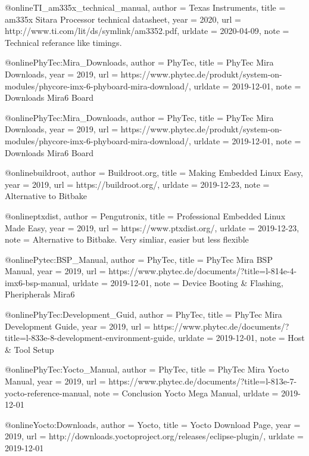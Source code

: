 @online{TI_am335x_technical_manual,
author = {Texas Instruments},
title = {am335x Sitara Processor technical datasheet},
year = 2020,
url = {http://www.ti.com/lit/ds/symlink/am3352.pdf},
urldate = {2020-04-09},
note = {Technical referance like timings.}
}




@online{PhyTec:Mira_Downloads,
author = {PhyTec},
title = {{PhyTec Mira} Downloads},
year = 2019,
url = {https://www.phytec.de/produkt/system-on-modules/phycore-imx-6-phyboard-mira-download/},
urldate = {2019-12-01},
note = {Downloads Mira6 Board}
}




@online{PhyTec:Mira_Downloads,
author = {PhyTec},
title = {{PhyTec Mira} Downloads},
year = 2019,
url = {https://www.phytec.de/produkt/system-on-modules/phycore-imx-6-phyboard-mira-download/},
urldate = {2019-12-01},
note = {Downloads Mira6 Board}
}

@online{buildroot,
author = {Buildroot.org},
title = {Making Embedded Linux Easy},
year = 2019,
url =  {https://buildroot.org/},
urldate = {2019-12-23},
note = {Alternative to Bitbake}
}

@online{ptxdist,
    author = {Pengutronix},
    title = {Professional Embedded Linux Made Easy},
    year = 2019,
    url = {https://www.ptxdist.org/},
    urldate = {2019-12-23},
    note = { Alternative to Bitbake. Very simliar, easier but less flexible}
}



@online{Pytec:BSP_Manual,
author = {PhyTec},
title = {{PhyTec Mira} BSP Manual},
year = 2019,
url = {https://www.phytec.de/documents/?title=l-814e-4-imx6-bsp-manual},
urldate = {2019-12-01},
note = {Device Booting \& Flashing, Pheripherals Mira6}
}

@online{PhyTec:Development_Guid,
author = {PhyTec},
title = {{PhyTec Mira} Development Guide},
year = 2019,
url = {https://www.phytec.de/documents/?title=l-833e-8-development-environment-guide},
urldate = {2019-12-01},
note = {Host \& Tool Setup}
}


@online{PhyTec:Yocto_Manual,
author = {PhyTec},
title = {{PhyTec Mira} Yocto Manual},
year = 2019,
url = {https://www.phytec.de/documents/?title=l-813e-7-yocto-reference-manual},
note = {Conclusion Yocto Mega Manual},
urldate = {2019-12-01}
}



@online{Yocto:Downloads,
author = {Yocto},
title = {{Yocto} Download Page},
year = 2019,
url = {http://downloads.yoctoproject.org/releases/eclipse-plugin/},
urldate = {2019-12-01}
}


